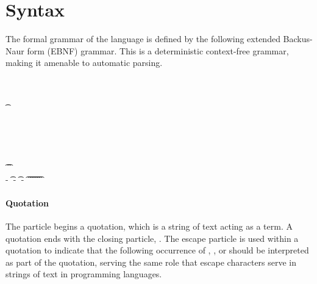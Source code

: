 \section{Syntax} \label{sec:syntax}

The formal grammar of the language is defined by the following extended
Backus-Naur form (EBNF) grammar. This is a deterministic context-free grammar,
making it amenable to automatic parsing.

\begin{ebnf}
	 \is {} 
	\\
	 \is {} \alt {}
	\\
	 \is {}
	\altLine \t{} 
	\altLine {}  
	\\
	 \is {}
	\altLine {}  
	\altLine {}  
	\\
	 \is {}
	\altLine {}
	\altLine {}
	\altLine {}
	\altLine {}  
	\\
	 \is {}  
	\\
	 \is {} \alt {}
	\altLine {}  
	\\
	 \is \t{}  \t{}
	\\
	 \is {} - \t{} - \t{} - \t{}
	\altLine \t{} \t{}
	\altLine \t{} \t{}
	\altLine \t{} \t{}
\end{ebnf}


\paragraph{Quotation} The particle  begins a quotation, which is a
string of text acting as a term. A quotation ends with the closing particle,
. The escape particle  is used within a quotation to
indicate that the following occurrence of , , or
 should be interpreted as part of the quotation, serving the same
role that escape characters serve in strings of text in programming languages.

